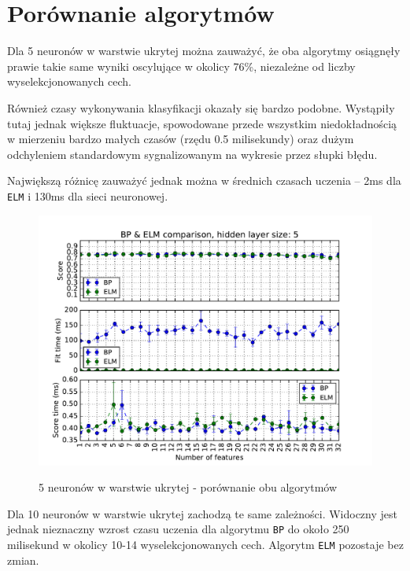 \newpage

\section{Porównanie algorytmów}

Dla 5 neuronów w warstwie ukrytej można zauważyć, że oba algorytmy osiągnęły prawie takie same wyniki oscylujące w okolicy 76\%, niezależne od liczby wyselekcjonowanych cech.

Również czasy wykonywania klasyfikacji okazały się bardzo podobne.
Wystąpiły tutaj jednak większe fluktuacje, spowodowane przede wszystkim niedokładnością w mierzeniu bardzo małych czasów (rzędu 0.5 milisekundy) oraz dużym odchyleniem standardowym sygnalizowanym na wykresie przez słupki błędu.

Największą różnicę zauważyć jednak można w średnich czasach uczenia -- 2ms dla \texttt{ELM} i 130ms dla sieci neuronowej.

\begin{figure}[h!]
	\centering
	\includegraphics[width=0.88\linewidth]{img/bp_elm_5.pdf}
	\label{Rysunek}
	\caption{5 neuronów w warstwie ukrytej - porównanie obu algorytmów}
\end{figure}

\newpage

Dla 10 neuronów w warstwie ukrytej zachodzą te same zależności. Widoczny jest jednak nieznaczny wzrost czasu uczenia dla algorytmu \texttt{BP} do około 250 milisekund w okolicy 10-14 wyselekcjonowanych cech. Algorytm \texttt{ELM} pozostaje bez zmian.

